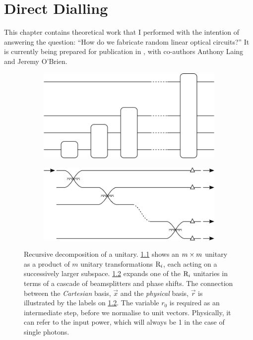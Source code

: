 \chapter{Direct Dialling}
\label{ch:DirectDialling}
This chapter contains theoretical work that I performed with the intention of
answering the question: ``How do we fabricate random linear optical circuits?''
It is currently being prepared for publication in \cite{dialling}, with
co-authors Anthony Laing and Jeremy O'Brien.

\begin{figure}[t]
  \begin{subfigure}{0.52\textwidth}
    \includegraphics{figures/recursive}
    \caption{}
    \label{fig:recursive}
  \end{subfigure}
  \begin{subfigure}{0.48\textwidth}
    \includegraphics{figures/cascade}
    \caption{}
    \label{fig:cascade}
  \end{subfigure}
  \caption[Recursive decomposition of a unitary]
    {Recursive decomposition of a unitary. \ref{fig:recursive} shows an
    \(m \times m\) unitary as a product of \(m\) unitary transformations
    \(\mathrm{R}_{i}\), each acting on a successively larger subspace.
    \ref{fig:cascade} expands one of the \(\mathrm{R}_{i}\) unitaries in terms of
    a cascade of beamsplitters and phase shifts. The connection between the
    \emph{Cartesian} basis, \(\vec{x}\) and the \emph{physical} basis,
    \(\vec{r}\) is illustrated by the labels on \ref{fig:cascade}. The variable
    \(r_{0}\) is required as an intermediate step, before we normalise to unit
    vectors. Physically, it can refer to the input power, which will always be 1
    in the case of single photons.}
  \label{fig:reck}
\end{figure}

